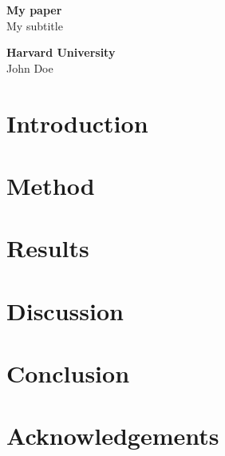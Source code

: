 \documentclass[12pt,a4paper]{article}
\title{\mytitle}
\newcommand{\mytitle}{My paper}
\newcommand{\mysubtitle}{My subtitle}
\newcommand{\myauthor}{John Doe}
\newcommand{\myinstitution}{Harvard University}
\begin{document}
\doublespacing

\begin{titlepage}
   \begin{center}
       \vspace*{1cm}

       \textbf{\mytitle} \\
       \mysubtitle \\

       \vspace{1.5cm}
       
       \textbf{\myinstitution} \\
       \myauthor

       \vfill
            
       \vspace{0.8cm}
            
   \end{center}
\end{titlepage}

\begin{abstract}
\end{abstract}

\section*{Introduction}

\section*{Method}

\section*{Results}

\section*{Discussion}

\section*{Conclusion}

\section*{Acknowledgements}

\begin{thebibliography}{9}

\end{thebibliography}
\end{document}
